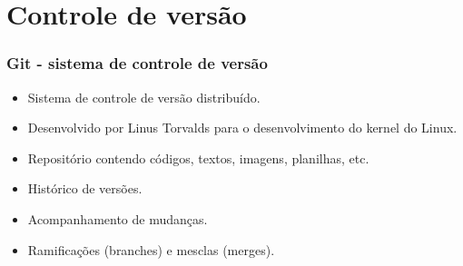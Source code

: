 \section{Controle de versão}

\begin{frame}
\frametitle{Git - sistema de controle de versão}

\begin{itemize}
\item Sistema de controle de versão distribuído.
\item Desenvolvido por Linus Torvalds para o desenvolvimento do kernel do Linux.
\item Repositório contendo códigos, textos, imagens, planilhas, etc.
\item Histórico de versões.
\item Acompanhamento de mudanças.
\item Ramificações (branches) e mesclas (merges).
\end{itemize}
\end{frame}

